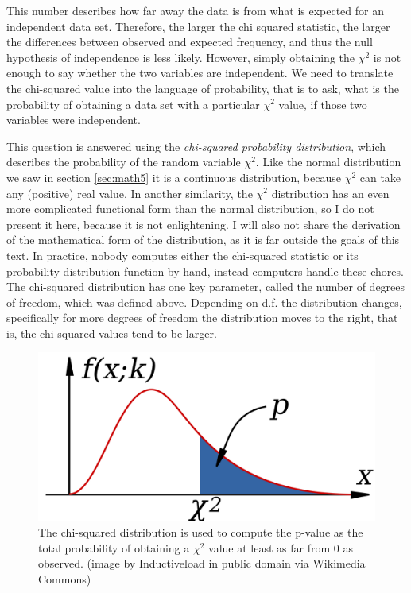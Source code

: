 \documentclass[
]{book}
\theoremstyle{definition}
\theoremstyle{definition}
\theoremstyle{definition}
\theoremstyle{remark}
\begin{document}
This number describes how far away the data is from what is expected for an independent data set. Therefore, the larger the chi squared statistic, the larger the differences between observed and expected frequency, and thus the null hypothesis of independence is less likely. However, simply obtaining the \(\chi^2\) is not enough to say whether the two variables are independent. We need to translate the chi-squared value into the language of probability, that is to ask, what is the probability of obtaining a data set with a particular \(\chi^2\) value, if those two variables were independent.

This question is answered using the \emph{chi-squared probability distribution}, which describes the probability of the random variable \(\chi^2\). Like the normal distribution we saw in section \ref{sec:math5} it is a continuous distribution, because \(\chi^2\) can take any (positive) real value. In another similarity, the \(\chi^2\) distribution has an even more complicated functional form than the normal distribution, so I do not present it here, because it is not enlightening. I will also not share the derivation of the mathematical form of the distribution, as it is far outside the goals of this text. In practice, nobody computes either the chi-squared statistic or its probability distribution function by hand, instead computers handle these chores. The chi-squared distribution has one key parameter, called the number of degrees of freedom, which was defined above. Depending on d.f. the distribution changes, specifically for more degrees of freedom the distribution moves to the right, that is, the chi-squared values tend to be larger.

\begin{figure}
\centering
\includegraphics{ch6/Chi-Squared_Distribution.png}
\caption{The chi-squared distribution is used to compute the p-value as the total probability of obtaining a \(\chi^2\) value at least as far from 0 as observed. (image by Inductiveload in public domain via Wikimedia Commons)}
\end{figure}
\end{document}
